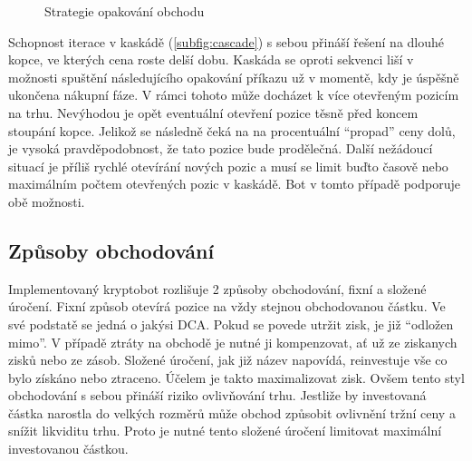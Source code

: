 \begin{figure}[ht]
    \centering
    \qquad
    \caption{Strategie opakování obchodu}
    \label{fig:trade-repeat}
\end{figure}

Schopnost iterace v kaskádě (\ref{subfig:cascade}) s sebou přináší řešení na dlouhé kopce, ve kterých cena roste delší dobu. Kaskáda se oproti sekvenci liší v možnosti spuštění následujícího opakování příkazu
už v momentě, kdy je úspěšně ukončena nákupní fáze. V rámci tohoto může docházet k více otevřeným pozicím na trhu. Nevýhodou je opět eventuální otevření pozice těsně před koncem stoupání
kopce. Jelikož se následně čeká na na procentuální \enquote{propad} ceny dolů, je vysoká pravděpodobnost, že tato pozice bude prodělečná. Další nežádoucí situací je příliš rychlé otevírání
nových pozic a musí se limit buďto časově nebo maximálním počtem otevřených pozic v kaskádě. Bot v tomto případě podporuje obě možnosti.

\subsection{Způsoby obchodování}
Implementovaný kryptobot rozlišuje 2 způsoby obchodování, fixní a složené úročení. Fixní způsob otevírá pozice na vždy stejnou obchodovanou částku. Ve své podstatě se jedná o jakýsi DCA. Pokud se
povede utržit zisk, je již \enquote{odložen mimo}. V případě ztráty na obchodě je nutné ji kompenzovat, ať už ze ziskanych zisků nebo ze zásob.
Složené úročení, jak již název napovídá, reinvestuje vše co bylo získáno nebo ztraceno. Účelem je takto maximalizovat zisk. Ovšem tento styl obchodování s sebou přináší riziko ovlivňování trhu. Jestliže
by investovaná částka narostla do velkých rozměrů může obchod způsobit ovlivnění tržní ceny a snížit likviditu trhu. Proto je nutné tento složené úročení limitovat maximální investovanou částkou.


